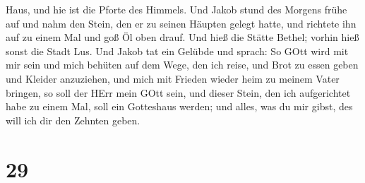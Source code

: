 Haus, und hie ist die Pforte des Himmels.  Und Jakob stund
des Morgens frühe auf und nahm den Stein, den er zu seinen Häupten
gelegt hatte, und richtete ihn auf zu einem Mal und goß Öl oben drauf.
 Und hieß die Stätte Bethel; vorhin hieß sonst die Stadt
Lus.  Und Jakob tat ein Gelübde und sprach: So GOtt wird
mit mir sein und mich behüten auf dem Wege, den ich reise, und Brot zu
essen geben und Kleider anzuziehen,  und mich mit Frieden
wieder heim zu meinem Vater bringen, so soll der HErr mein GOtt sein,
 und dieser Stein, den ich aufgerichtet habe zu einem Mal,
soll ein Gotteshaus werden; und alles, was du mir gibst, des will ich
dir den Zehnten geben.

\hypertarget{section-28}{%
\section{29}\label{section-28}}

